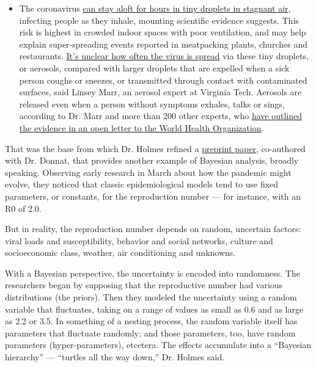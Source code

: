 \begin{itemize}
  \begin{itemize}
  \tightlist
  \item
    The coronavirus
    \href{https://www.nytimes3xbfgragh.onion/2020/07/04/health/239-experts-with-one-big-claim-the-coronavirus-is-airborne.html?action=click\&pgtype=Article\&state=default\&region=MAIN_CONTENT_3\&context=storylines_faq}{can
    stay aloft for hours in tiny droplets in stagnant air}, infecting
    people as they inhale, mounting scientific evidence suggests. This
    risk is highest in crowded indoor spaces with poor ventilation, and
    may help explain super-spreading events reported in meatpacking
    plants, churches and restaurants.
    \href{https://www.nytimes3xbfgragh.onion/2020/07/06/health/coronavirus-airborne-aerosols.html?action=click\&pgtype=Article\&state=default\&region=MAIN_CONTENT_3\&context=storylines_faq}{It's
    unclear how often the virus is spread} via these tiny droplets, or
    aerosols, compared with larger droplets that are expelled when a
    sick person coughs or sneezes, or transmitted through contact with
    contaminated surfaces, said Linsey Marr, an aerosol expert at
    Virginia Tech. Aerosols are released even when a person without
    symptoms exhales, talks or sings, according to Dr. Marr and more
    than 200 other experts, who
    \href{https://academic.oup.com/cid/article/doi/10.1093/cid/ciaa939/5867798}{have
    outlined the evidence in an open letter to the World Health
    Organization}.
  \end{itemize}
\end{itemize}

That was the base from which Dr. Holmes refined a
\href{https://arxiv.org/abs/2004.05272}{preprint paper}, co-authored
with Dr. Donnat, that provides another example of Bayesian analysis,
broadly speaking. Observing early research in March about how the
pandemic might evolve, they noticed that classic epidemiological models
tend to use fixed parameters, or constants, for the reproduction number
--- for instance, with an R0 of 2.0.

But in reality, the reproduction number depends on random, uncertain
factors: viral loads and susceptibility, behavior and social networks,
culture and socioeconomic class, weather, air conditioning and unknowns.

With a Bayesian perspective, the uncertainty is encoded into randomness.
The researchers began by supposing that the reproductive number had
various distributions (the priors). Then they modeled the uncertainty
using a random variable that fluctuates, taking on a range of values as
small as 0.6 and as large as 2.2 or 3.5. In something of a nesting
process, the random variable itself has parameters that fluctuate
randomly; and those parameters, too, have random parameters
(hyper-parameters), etcetera. The effects accumulate into a ``Bayesian
hierarchy'' --- ``turtles all the way down,'' Dr. Holmes said.

